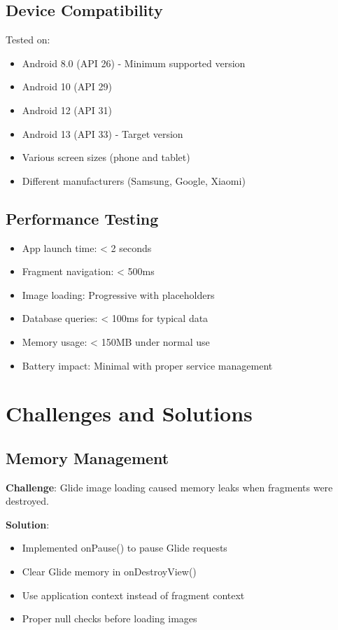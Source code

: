 \documentclass[12pt,a4paper]{article}
\begin{document}
\subsection{Device Compatibility}
Tested on:
\begin{itemize}
    \item Android 8.0 (API 26) - Minimum supported version
    \item Android 10 (API 29)
    \item Android 12 (API 31)
    \item Android 13 (API 33) - Target version
    \item Various screen sizes (phone and tablet)
    \item Different manufacturers (Samsung, Google, Xiaomi)
\end{itemize}

\subsection{Performance Testing}
\begin{itemize}
    \item App launch time: < 2 seconds
    \item Fragment navigation: < 500ms
    \item Image loading: Progressive with placeholders
    \item Database queries: < 100ms for typical data
    \item Memory usage: < 150MB under normal use
    \item Battery impact: Minimal with proper service management
\end{itemize}

\newpage

\section{Challenges and Solutions}

\subsection{Memory Management}
\textbf{Challenge}: Glide image loading caused memory leaks when fragments were destroyed.

\textbf{Solution}:
\begin{itemize}
    \item Implemented onPause() to pause Glide requests
    \item Clear Glide memory in onDestroyView()
    \item Use application context instead of fragment context
    \item Proper null checks before loading images
\end{itemize}
\end{document}
